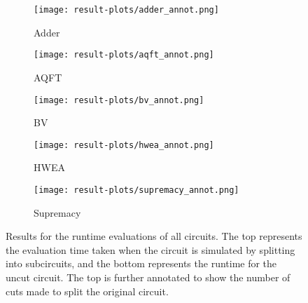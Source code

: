 \begin{figure*}[htbp]
\centering
\begin{subfigure}{0.33\textwidth}
  \centering
  \texttt{[image: result-plots/adder\_annot.png]}
  \caption{Adder}
  \label{fig:results/adder-annot}
\end{subfigure}%
\begin{subfigure}{0.33\textwidth}
  \centering
  \texttt{[image: result-plots/aqft\_annot.png]}
  \caption{AQFT}
  \label{fig:results/aqft-annot}
\end{subfigure}%
\begin{subfigure}{0.33\textwidth}
  \centering
  \texttt{[image: result-plots/bv\_annot.png]}
  \caption{BV}
  \label{fig:results/bv-annot}
\end{subfigure}%

\begin{subfigure}{0.33\textwidth}
  \centering
  \texttt{[image: result-plots/hwea\_annot.png]}
  \caption{HWEA}
  \label{fig:results/hwea-annot}
\end{subfigure}%
\begin{subfigure}{0.33\textwidth}
  \centering
  \texttt{[image: result-plots/supremacy\_annot.png]}
  \caption{Supremacy}
  \label{fig:results/supremacy-annot}
\end{subfigure}
\caption{ Results for the runtime evaluations of all circuits. The top represents the evaluation time taken when the circuit is simulated by splitting into subcircuits, and the bottom represents the runtime for the uncut circuit. The top is further annotated to show the number of cuts made to split the original circuit. }
\label{fig:results}
\end{figure*}



